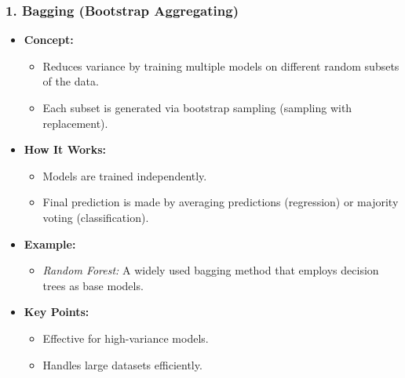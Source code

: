 \documentclass[aspectratio=169]{beamer}
\begin{document}
\begin{frame}[fragile]
    \frametitle{1. Bagging (Bootstrap Aggregating)}
    \begin{itemize}
        \item \textbf{Concept:}
        \begin{itemize}
            \item Reduces variance by training multiple models on different random subsets of the data.
            \item Each subset is generated via bootstrap sampling (sampling with replacement).
        \end{itemize}
        
        \item \textbf{How It Works:}
        \begin{itemize}
            \item Models are trained independently.
            \item Final prediction is made by averaging predictions (regression) or majority voting (classification).
        \end{itemize}
        
        \item \textbf{Example:}
        \begin{itemize}
            \item \textit{Random Forest:} A widely used bagging method that employs decision trees as base models.
        \end{itemize}

        \item \textbf{Key Points:}
        \begin{itemize}
            \item Effective for high-variance models.
            \item Handles large datasets efficiently.
        \end{itemize}
    \end{itemize}
\end{frame}
\end{document}
